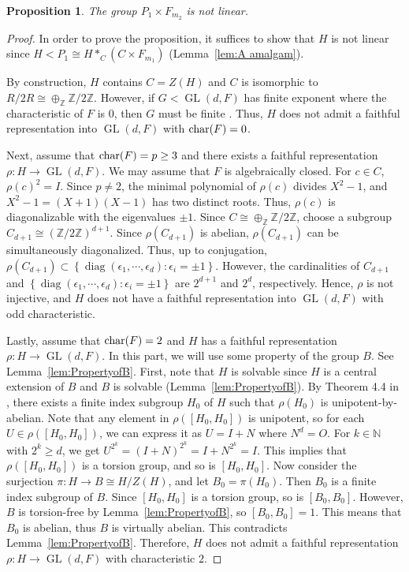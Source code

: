 \documentclass[11pt]{amsart}
\newtheorem{prop}[thm]{Proposition}
\theoremstyle{definition}
\DeclareMathOperator{\GL}{GL}
\DeclareMathOperator{\diag}{diag}
\newcommand{\NN}{\mathbb{N}}
\newcommand{\ZZ}{\mathbb{Z}}
\begin{document}
 \begin{prop} \label{prop:Not_linear}
 The group $P_1 \times F_{m_2}$ is not linear.
 \end{prop}
 \begin{proof}
 In order to prove the proposition, it suffices to show that $H$ is not linear since $H<P_1 \cong H*_C(C \times F_{m_1})$ (Lemma~\ref{lem:A amalgam}).

 By construction, $H$ contains $C=Z(H)$ and $C$ is isomorphic to $R/2R \cong \oplus_\ZZ \ZZ/2\ZZ$.
 However, if $G < \GL(d,F)$ has finite exponent where the characteristic of $F$ is $0$, then $G$ must be finite \cite[p.15]{wehrfritz2012infinite}.
 Thus, $H$ does not admit a faithful representation into $\GL(d,F)$ with $\textnormal{char}(F)=0$.

 Next, assume that $\textnormal{char}(F)=p \geq 3$ and there exists a faithful representation $\rho:H \to \GL(d,F)$.
 We may assume that $F$ is algebraically closed.
 For $c \in C$, $\rho(c)^2=I$.
 Since $p \neq 2$, the minimal polynomial of $\rho(c)$ divides $X^2-1$, and $X^2-1=(X+1)(X-1)$ has two distinct roots.
 Thus, $\rho(c)$ is diagonalizable with the eigenvalues $\pm 1$.
 Since $C \cong \oplus_\ZZ \ZZ/2\ZZ$, choose a subgroup $C_{d+1} \cong (\ZZ / 2\ZZ)^{d+1}$.
 Since $\rho(C_{d+1})$ is abelian, $\rho(C_{d+1})$ can be simultaneously diagonalized.
 Thus, up to conjugation, $\rho(C_{d+1}) \subset \left \{ \diag(\epsilon_1 , \cdots, \epsilon_d) : \epsilon_i = \pm1 \right \}.$
 However, the cardinalities of $C_{d+1}$ and $\left \{ \diag(\epsilon_1 , \cdots, \epsilon_d) : \epsilon_i = \pm1 \right \}$ are $2^{d+1}$ and $2^d$, respectively.
 Hence, $\rho$ is not injective, and $H$ does not have a faithful representation into $\GL(d,F)$ with odd characteristic.

 Lastly, assume that $\textnormal{char}(F)=2$ and $H$ has a faithful representation $\rho:H \to \GL(d,F)$.
 In this part, we will use some property of the group $B$. See Lemma~\ref{lem:PropertyofB}.
 First, note that $H$ is solvable since $H$ is a central extension of $B$ and $B$ is solvable (Lemma~\ref{lem:PropertyofB}).
 By Theorem 4.4 in \cite{detinko2019linear}, there exists a finite index subgroup $H_0$ of $H$ such that $\rho(H_0)$ is unipotent-by-abelian.
 Note that any element in $\rho([H_0,H_0])$ is unipotent, so for each $U \in \rho([H_0,H_0])$, we can express it as $U=I+N$ where $N^d=O$.
 For $k \in \NN$ with $2^k \geq d$, we get $U^{2^k} = (I+N)^{2^k}=I+N^{2^k}=I$.
 This implies that $\rho([H_0,H_0])$ is a torsion group, and so is $[H_0,H_0]$.
 Now consider the surjection $\pi: H \to B \cong H/Z(H)$, and let $B_0=\pi(H_0)$.
 Then $B_0$ is a finite index subgroup of $B$.
 Since $[H_0,H_0]$ is a torsion group, so is $[B_0,B_0]$.
 However, $B$ is torsion-free by Lemma~\ref{lem:PropertyofB}, so $[B_0,B_0]=1$.
 This means that $B_0$ is abelian, thus $B$ is virtually abelian.
 This contradicts Lemma~\ref{lem:PropertyofB}.
 Therefore, $H$ does not admit a faithful representation $\rho:H \to \GL(d,F)$ with characteristic $2$.
 \end{proof}
\end{document}
